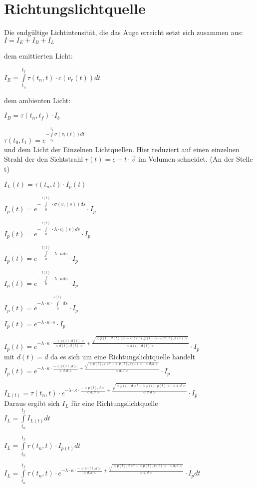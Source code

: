 \documentclass[]{article}
\begin{document}
\section{Richtungslichtquelle}

Die endgültige Lichtintensität, die das Auge erreicht setzt sich zusammen aus: \\
 
$I = I_E + I_B + I_L$

dem emittierten Licht:

$I_E = \int\limits_{t_n}^{t_f} \tau(t_n, t) \cdot c(v_r(t)) dt $

dem ambienten Licht:

$I_B = \tau(t_n, t_f) \cdot I_b$

$\tau(t_0, t_1) = e^{- \int\limits_{t_0}^{t_1} \sigma (v_r(t)) dt}$ \\

und dem Licht der Einzelnen Lichtquellen. Hier reduziert auf einen einzelnen Strahl der den Sichtstrahl $\underline{r}(t) = \underline{e} + t \cdot \vec{v}$ im Volumen schneidet. (An der Stelle t)

$I_L(t) = \tau(t_n, t) \cdot I_p(t)$

$I_p(t) = e^{- \int\limits_{0}^{l(t)} \cdot  \sigma (v_r(s)) ds} \cdot I_p$

$I_p(t) = e^{- \int\limits_{0}^{l(t)} \cdot  \lambda \cdot v_r(s) ds} \cdot I_p$

$I_p(t) = e^{- \int\limits_{0}^{l(t)} \cdot  \lambda \cdot \kappa ds} \cdot I_p$

$I_p(t) = e^{- \int\limits_{0}^{l(t)} \cdot  \lambda \cdot \kappa ds} \cdot I_p$

$I_p(t) = e^{- \lambda \cdot \kappa \cdot \int\limits_{0}^{l(t)} ds} \cdot I_p$

$I_p(t) = e^{- \lambda \cdot \kappa \cdot s} \cdot I_p$

$I_p(t) = e^{- \lambda \cdot \kappa \cdot \frac{-<p(t), d(t)>}{<d(t), d(t)>} + \frac{\sqrt{<p(t), d(t)>^2 - <p(t), p(t)> \cdot <d(t), d(t)>}}{<d(t), d(t)>}} \cdot I_p$ \\

mit $d(t) = d$ da es sich um eine Richtungslichtquelle handelt \\

$I_p(t) = e^{- \lambda \cdot \kappa \cdot \frac{-<p(t), d>}{<d, d>} + \frac{\sqrt{<p(t), d>^2 - <p(t), p(t)> \cdot <d, d>}}{<d, d>}} \cdot I_p$

$I_{L(t)} = \tau(t_n, t) \cdot e^{- \lambda \cdot \kappa \cdot \frac{-<p(t), d>}{<d, d>} + \frac{\sqrt{<p(t), d>^2 - <p(t), p(t)> \cdot <d, d>}}{<d, d>}} \cdot I_p$ \\

Daraus ergibt sich $I_L$ für eine Richtungslichtquelle \\

$I_L = \int\limits_{t_n}^{t_f} I_{L(t)} dt $

$I_L = \int\limits_{t_n}^{t_f} \tau(t_n, t) \cdot I_{p(t)} dt$

$I_L = \int\limits_{t_n}^{t_f} \tau(t_n, t) \cdot e^{- \lambda \cdot \kappa \cdot \frac{-<p(t), d>}{<d, d>} + \frac{\sqrt{<p(t), d>^2 - <p(t), p(t)> \cdot <d, d>}}{<d, d>}} \cdot I_p dt$
\end{document}
